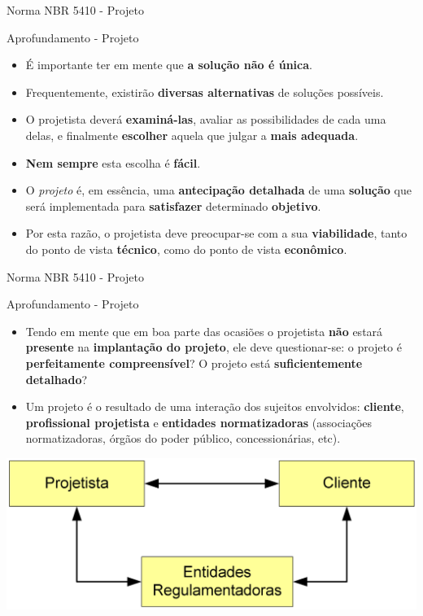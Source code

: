 \begin{frame}{Norma NBR 5410 - Projeto}
	\begin{block}{Aprofundamento - Projeto}
		\begin{itemize}
			\item É importante ter em mente que \textbf{a solução não é única}.
			\item Frequentemente, existirão \textbf{diversas alternativas} de soluções possíveis.
			\item O projetista deverá \textbf{examiná-las}, avaliar as possibilidades de cada uma delas, e finalmente \textbf{escolher} aquela que julgar a \textbf{mais adequada}.
			\item \textbf{Nem sempre} esta escolha é \textbf{fácil}.
			\item O \textit{projeto} é, em essência, uma \textbf{antecipação detalhada }de uma \textbf{solução }que será implementada para \textbf{satisfazer} determinado \textbf{objetivo}.
			\item Por esta razão, o projetista deve preocupar-se com a sua \textbf{viabilidade}, tanto do ponto de vista \textbf{técnico}, como do ponto de vista \textbf{econômico}.

		\end{itemize}
	\end{block}


\end{frame}


\begin{frame}{Norma NBR 5410 - Projeto}
	\begin{block}{Aprofundamento - Projeto}
		\begin{itemize}
			\item Tendo em mente que em boa parte das ocasiões o projetista \textbf{não }estará \textbf{presente }na \textbf{implantação do projeto}, ele deve questionar-se: o projeto é \textbf{perfeitamente compreensível}? O projeto está \textbf{suficientemente detalhado}?
			\item Um projeto é o resultado de uma interação dos sujeitos envolvidos: \textbf{cliente}, \textbf{profissional projetista }e \textbf{entidades normatizadoras }(associações normatizadoras, órgãos do poder público, concessionárias, etc).
		\end{itemize}
	\end{block}

	\centering
	\includegraphics[width=0.6\linewidth]{Figuras/Ch02/fig5}

\end{frame}


